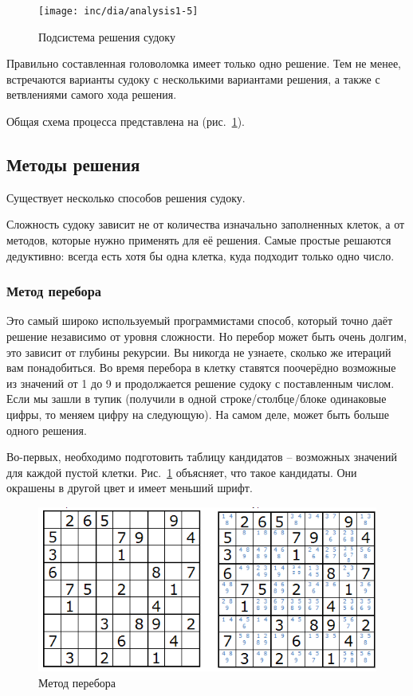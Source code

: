 \begin{figure}[ht]
	\centering
	\texttt{[image: inc/dia/analysis1-5]}
	\caption{Подсистема решения судоку}
  \label{fig:fig05}
\end{figure}

Правильно составленная головоломка имеет только одно решение. Тем не менее, встречаются варианты судоку с несколькими вариантами решения, а также с ветвлениями самого хода решения.

Общая схема процесса представлена на (рис.~\ref{fig:fig05}).

\subsection{Методы решения}
Существует несколько способов решения судоку.

Сложность судоку зависит не от количества изначально заполненных клеток, а от методов, которые нужно применять для её решения. Самые простые решаются дедуктивно: всегда есть хотя бы одна клетка, куда подходит только одно число. 

\subsubsection*{Метод перебора}
Это самый широко используемый программистами способ, который точно даёт решение независимо от уровня сложности. Но перебор может быть очень долгим, это зависит от глубины рекурсии. Вы никогда не узнаете, сколько же итераций вам понадобиться. Во время перебора в клетку ставятся поочерёдно возможные из значений от 1 до 9 и продолжается решение судоку с поставленным числом. Если мы зашли в тупик (получили в одной строке/столбце/блоке одинаковые цифры, то меняем цифру на следующую). На самом деле, может быть больше одного решения.

Во-первых, необходимо подготовить таблицу кандидатов – возможных значений для каждой пустой клетки. Рис.~\ref{fig:fig05}  объясняет, что такое кандидаты. Они окрашены в другой цвет и имеет меньший шрифт. 

\begin{figure}[ht!]
 \centering 
 \includegraphics[width=\textwidth]{inc/raster/analysis1-6.png} 
 \caption{Метод перебора} 
 \label{fig:fig06} 
\end{figure}

